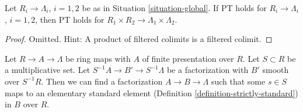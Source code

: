 \begin{lemma}
\label{lemma-product}
Let $R_i \to \Lambda_i$, $i = 1, 2$ be as in Situation \ref{situation-global}.
If PT holds for $R_i \to \Lambda_i$, $i = 1, 2$, then PT holds for
$R_1 \times R_2 \to \Lambda_1 \times \Lambda_2$.
\end{lemma}

\begin{proof}
Omitted. Hint: A product of filtered colimits is a filtered colimit.
\end{proof}

\begin{lemma}
\label{lemma-delocalize-base}
Let $R \to A \to \Lambda$ be ring maps with $A$ of finite presentation
over $R$. Let $S \subset R$ be a multiplicative
set. Let $S^{-1}A \to B' \to S^{-1}\Lambda$ be a factorization with
$B'$ smooth over $S^{-1}R$. Then we can find a factorization
$A \to B \to \Lambda$ such that some $s \in S$ maps to an
elementary standard element (Definition \ref{definition-strictly-standard})
in $B$ over $R$.
\end{lemma}

